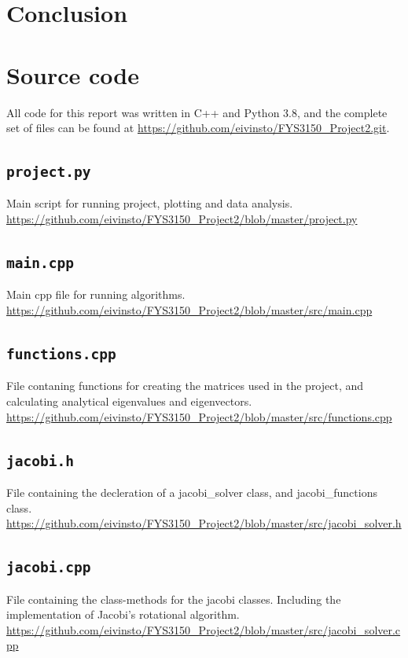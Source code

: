 \documentclass[reprint,english,notitlepage]{revtex4-1}  %
\begin{document}
\section{Conclusion} \label{sec:VI}


{}

\appendix
\section{Source code} \label{A}
All code for this report was written in C++ and Python 3.8, and the complete set of files can be found at \url{https://github.com/eivinsto/FYS3150_Project2.git}.

\cprotect\subsection{\verb+project.py+} \label{A.1}
Main script for running project, plotting and data analysis.
\url{https://github.com/eivinsto/FYS3150_Project2/blob/master/project.py}

\cprotect\subsection{\verb+main.cpp+} \label{A.2}
Main cpp file for running algorithms.
\url{https://github.com/eivinsto/FYS3150_Project2/blob/master/src/main.cpp}

\cprotect\subsection{\verb+functions.cpp+} \label{A.3}
File contaning functions for creating the matrices used in the project, and calculating analytical eigenvalues and eigenvectors.
\url{https://github.com/eivinsto/FYS3150_Project2/blob/master/src/functions.cpp}

\cprotect\subsection{\verb+jacobi.h+} \label{A.4}
File containing the decleration of a jacobi\_solver class, and jacobi\_functions class.
\url{https://github.com/eivinsto/FYS3150_Project2/blob/master/src/jacobi_solver.h}

\cprotect\subsection{\verb+jacobi.cpp+} \label{A.5}
File containing the class-methods for the jacobi classes. Including the implementation of Jacobi's rotational algorithm.
\url{https://github.com/eivinsto/FYS3150_Project2/blob/master/src/jacobi_solver.cpp}
\end{document}
